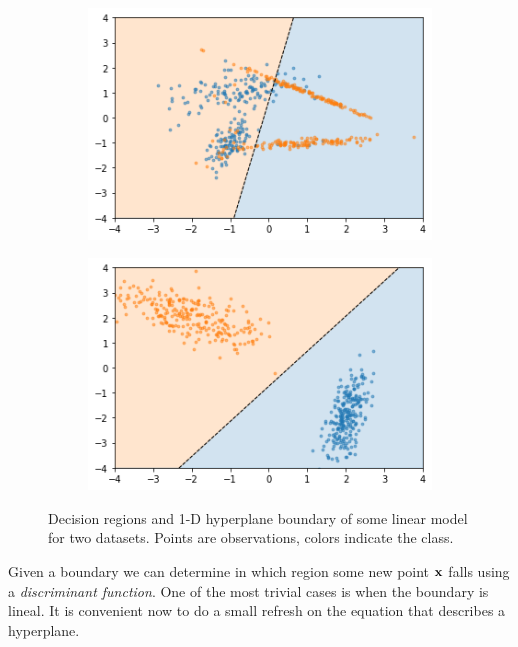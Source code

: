 \begin{figure}[H]
    \centering
    \begin{subfigure}[b]{0.4\linewidth}
        \includegraphics[width=\linewidth]{img/ch4/nolinsep.png}
    \end{subfigure}
    \begin{subfigure}[b]{0.4\linewidth}
        \includegraphics[width=\linewidth]{img/ch4/linsep.png}
    \end{subfigure}
    \caption[Linear vs non-linear separability]{Decision regions and 1-D hyperplane boundary of some linear model for two datasets. Points are observations, colors indicate the class.}
    \label{fig:ch4.sep}
\end{figure}

Given a boundary we can determine in which region some new point $\mathbf{x}$ falls using a \emph{discriminant function}. One of the most trivial cases is when the boundary is lineal. It is convenient now to do a small refresh on the equation that describes a hyperplane.

